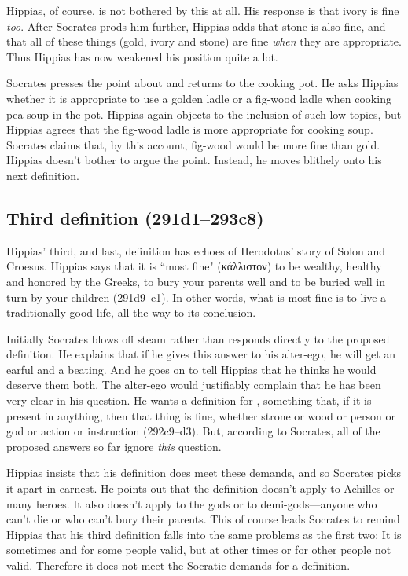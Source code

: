 \documentclass[12pt]{article}
\begin{document}
Hippias, of course, is not bothered by this at all.  His response is that ivory is fine \emph{too}.  After Socrates prods him further, Hippias adds that stone is also fine, and that all of these things (gold, ivory and stone) are fine \emph{when} they are appropriate.  Thus Hippias has now weakened his position quite a lot.

Socrates presses the point about  and returns to the cooking pot.  He asks Hippias whether it is appropriate to use a golden ladle or a fig-wood ladle when cooking pea soup in the pot.  Hippias again objects to the inclusion of such low topics, but Hippias agrees that the fig-wood ladle is more appropriate for cooking soup.  Socrates claims that, by this account, fig-wood would be more fine than gold.  Hippias doesn't bother to argue the point.  Instead, he moves blithely onto his next definition.


\subsection{Third definition (291d1--293c8)}

Hippias' third, and last, definition has echoes of Herodotus' story of Solon and Croesus.  Hippias says that it is ``most fine" ({\g κάλλιστον}) to be wealthy, healthy and honored by the Greeks, to bury your parents well and to be buried well in turn by your children (291d9--e1).  In other words, what is most fine is to live a traditionally good life, all the way to its conclusion.

Initially Socrates blows off steam rather than responds directly to the proposed definition.  He explains that if he gives this answer to his alter-ego, he will get an earful and a beating.  And he goes on to tell Hippias that he thinks he would deserve them both.  The alter-ego would justifiably complain that he has been very clear in his question. He wants a definition for , something that, if it is present in anything, then that thing is fine, whether strone or wood or person or god or action or instruction (292c9--d3).  But, according to Socrates, all of the proposed answers so far ignore \emph{this} question.

Hippias insists that his definition does meet these demands, and so Socrates picks it apart in earnest.  He points out that the definition doesn't apply to Achilles or many heroes.  It also doesn't apply to the gods or to demi-gods---anyone who can't die or who can't bury their parents.  This of course leads Socrates to remind Hippias that his third definition falls into the same problems as the first two: It is sometimes and for some people valid, but at other times or for other people not valid.  Therefore it does not meet the Socratic demands for a definition.
\end{document}
